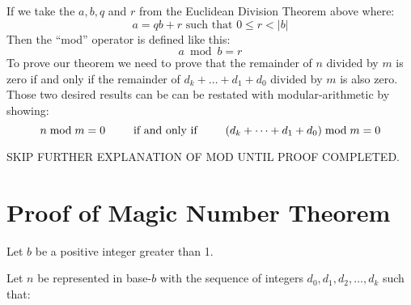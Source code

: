 \documentclass{article}
\begin{document}
If we take the $a,b,q$ and $r$ from the Euclidean Division Theorem above where:
\[a=qb+r  \text{ such that } 0\le{}r<\lvert{}b\rvert\]
Then the ``mod'' operator is defined like this:
\[a\bmod{b} = r\]
%
%
%
%
%
To prove our theorem we need to prove that 
the remainder of $n$ divided by $m$ is zero if and only if
the remainder of $d_k+\dots+d_1+d_0$ divided by $m$ 
is also zero. Those two desired results can be
can be restated 
with modular-arithmetic by showing:
\[n\bmod{m} = 0\text{\hspace{2.5em}if and only if\hspace{2.5em}}(d_k+\dots+d_1+d_0)\bmod{m} = 0\]

SKIP FURTHER EXPLANATION OF MOD UNTIL PROOF COMPLETED.

\section*{Proof of Magic Number Theorem}

Let $b$ be a positive integer greater than 1.

Let $n$ be represented in base-$b$ with the sequence
of integers $d_0, d_1, d_2,\dots{},d_k$ such that:
\end{document}
